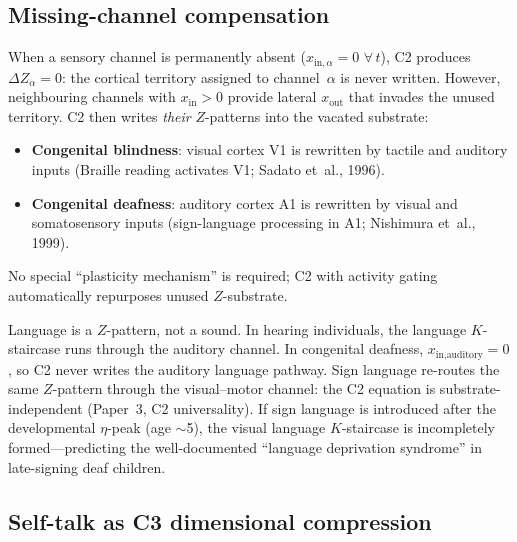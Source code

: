 \documentclass[aps,pre,twocolumn,superscriptaddress,floatfix]{revtex4-2}
\begin{document}
\subsection{Missing-channel compensation}
\label{sec:missing-channel}

\begin{remark}
\label{rem:cross-modal}
When a sensory channel is permanently absent
($x_{\text{in},\alpha} = 0$ $\forall\,t$), C2 produces
$\Delta Z_\alpha = 0$: the cortical territory
assigned to channel~$\alpha$ is never written.
However, neighbouring channels with
$x_{\text{in}} > 0$ provide lateral
$x_{\text{out}}$ that invades the unused territory.
C2 then writes \emph{their} $Z$-patterns into the
vacated substrate:
\begin{itemize}
  \item \textbf{Congenital blindness}: visual cortex V1
    is rewritten by tactile and auditory inputs
    (Braille reading activates V1; Sadato et~al., 1996).
  \item \textbf{Congenital deafness}: auditory cortex A1
    is rewritten by visual and somatosensory inputs
    (sign-language processing in A1; Nishimura et~al., 1999).
\end{itemize}
No special ``plasticity mechanism'' is required;
C2 with activity gating automatically repurposes unused
$Z$-substrate.
\end{remark}

\begin{remark}
\label{rem:deaf-language}
Language is a $Z$-pattern, not a sound.
In hearing individuals, the language $K$-staircase
runs through the auditory channel.
In congenital deafness, $x_{\text{in,auditory}} = 0$,
so C2 never writes the auditory language pathway.
Sign language re-routes the same $Z$-pattern through
the visual--motor channel:
the C2 equation is substrate-independent
(Paper~3, C2 universality).
If sign language is introduced after the developmental
$\eta$-peak (age $\sim$5), the visual language
$K$-staircase is incompletely formed---predicting the
well-documented ``language deprivation syndrome'' in
late-signing deaf children.
\end{remark}

\subsection{Self-talk as C3 dimensional compression}
\label{sec:self-talk}
\end{document}
